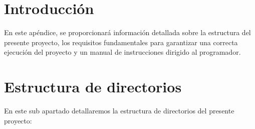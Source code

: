 
\section{Introducción}
En este apéndice, se proporcionará información detallada sobre la estructura del presente proyecto, los requisitos fundamentales para garantizar una correcta ejecución del proyecto y un manual de instrucciones dirigido al programador.

\section{Estructura de directorios}

En este sub apartado detallaremos la estructura de directorios del presente proyecto:

